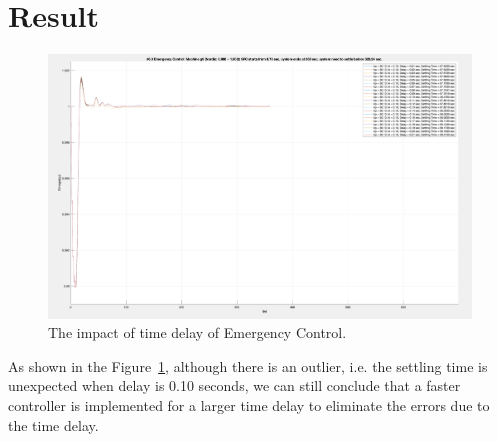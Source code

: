 \section{Result} %
\begin{figure}[htbp]
\centering
\includegraphics[width = .819\textwidth]{figure/6_3.png}
\caption{The impact of time delay of Emergency Control.}
\label{6_3}
\end{figure}

As shown in the Figure~\ref{6_3}, although there is an outlier, i.e. the settling time is unexpected when delay is 0.10 seconds, we can still conclude that a faster controller is implemented for a larger time delay to eliminate the errors due to the time delay. 
